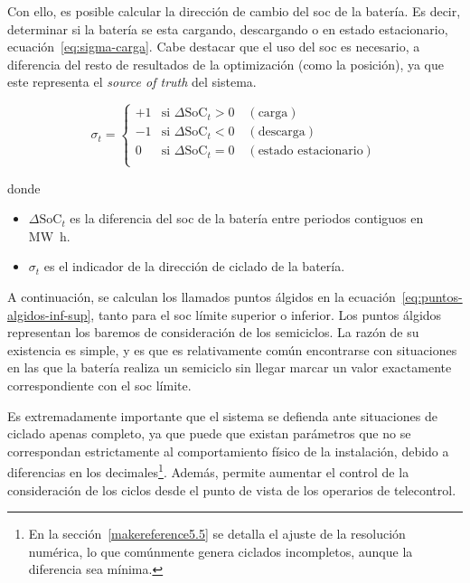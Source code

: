 Con ello, es posible calcular la dirección de cambio del \gls{soc} de la batería. Es decir, determinar si la batería se esta cargando, descargando o en estado estacionario, ecuación~\ref{eq:sigma-carga}. Cabe destacar que el uso del \gls{soc} es necesario, a diferencia del resto de resultados de la optimización (como la posición), ya que este representa el \textit{source of truth} del sistema.

\begin{samepage}

  \begin{equation}
    \label{eq:sigma-carga}
    \sigma_{t} =
    \begin{cases}
      +1 & \text{si } \Delta\mathrm{SoC}_{t} > 0 \quad (\text{carga})               \\
      -1 & \text{si } \Delta\mathrm{SoC}_{t} < 0 \quad (\text{descarga})            \\
      0  & \text{si } \Delta\mathrm{SoC}_{t} = 0 \quad (\text{estado estacionario}) \\
    \end{cases}
  \end{equation}

  donde

  \begin{itemize}

    \item \( \Delta \mathrm{SoC}_{t} \) es la diferencia del \gls{soc} de la batería entre periodos contiguos en \si{{\mega\watt\hour}}.

    \item \( \sigma_{t} \) es el indicador de la dirección de ciclado de la batería.

  \end{itemize}

\end{samepage}

A continuación, se calculan los llamados puntos álgidos en la ecuación~\ref{eq:puntos-algidos-inf-sup}, tanto para el \gls{soc} límite superior o inferior. Los puntos álgidos representan los baremos de consideración de los semiciclos. La razón de su existencia es simple, y es que es relativamente común encontrarse con situaciones en las que la batería realiza un semiciclo sin llegar marcar un valor exactamente correspondiente con el \gls{soc} límite.

Es extremadamente importante que el sistema se defienda ante situaciones de ciclado apenas completo, ya que puede que existan parámetros que no se correspondan estrictamente al comportamiento físico de la instalación, debido a diferencias en los decimales\footnote{En la sección~\ref{makereference5.5} se detalla el ajuste de la resolución numérica, lo que comúnmente genera ciclados incompletos, aunque la diferencia sea mínima.}. Además, permite aumentar el control de la consideración de los ciclos desde el punto de vista de los operarios de telecontrol.

